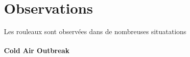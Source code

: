 \section{Observations}
Les rouleaux sont observées dans de nombreuses situatations
\paragraph{Cold Air Outbreak} 
